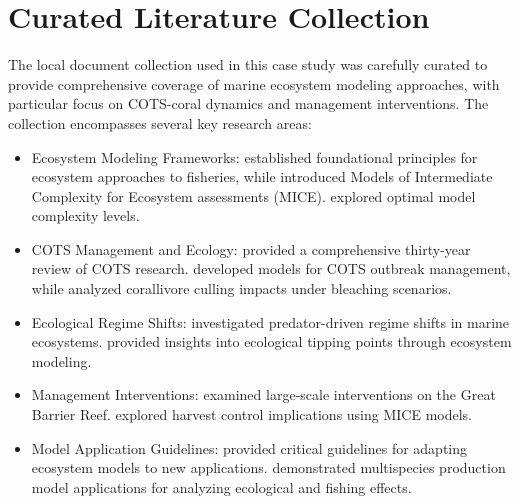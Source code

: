 \setcounter{section}{0}
\renewcommand{\thesection}{S\arabic{section}}

\section{Curated Literature Collection}
\label{subsec:curated_literature}

The local document collection used in this case study was carefully curated to provide comprehensive coverage of marine ecosystem modeling approaches, with particular focus on COTS-coral dynamics and management interventions. The collection encompasses several key research areas:

\begin{itemize}
\item Ecosystem Modeling Frameworks: \cite{Plaganyi_2007} established foundational principles for ecosystem approaches to fisheries, while \cite{Plaganyi_Punt_Hillary_Morello_Thebaud_Hutton_Pillans_Thorson_Fulton_Smith_et_al_2014} introduced Models of Intermediate Complexity for Ecosystem assessments (MICE). \cite{Collie_Botsford_Hastings_Kaplan_Largier_Livingston_Plaganyi_Rose_Wells_Werner_2016} explored optimal model complexity levels.

\item COTS Management and Ecology: \cite{Pratchett_Caballes_Wilmes_Matthews_Mellin_Sweatman_Nadler_Brodie_Thompson_Hoey_et_al_2017} provided a comprehensive thirty-year review of COTS research. \cite{Morello_Plaganyi_Babcock_Sweatman_Hillary_Punt_2014} developed models for COTS outbreak management, while \cite{Rogers_Plaganyi_2022} analyzed corallivore culling impacts under bleaching scenarios.

\item Ecological Regime Shifts: \cite{Blamey_Plaganyi_Branch_2014} investigated predator-driven regime shifts in marine ecosystems. \cite{Plaganyi_Ellis_Blamey_Morello_Norman-Lopez_Robinson_Sporcic_Sweatman_2014} provided insights into ecological tipping points through ecosystem modeling.

\item Management Interventions: \cite{Condie_Anthony_Babcock_Baird_Beeden_Fletcher_Gorton_Harrison_Hobday_Plaganyi_et_al_2021} examined large-scale interventions on the Great Barrier Reef. \cite{Punt_MacCall_Essington_Francis_Hurtado-Ferro_Johnson_Kaplan_Koehn_Levin_Sydeman_2016} explored harvest control implications using MICE models.

\item Model Application Guidelines: \cite{Essington_Plaganyi_2014} provided critical guidelines for adapting ecosystem models to new applications. \cite{Gamble_Link_2009} demonstrated multispecies production model applications for analyzing ecological and fishing effects.


\end{itemize}
